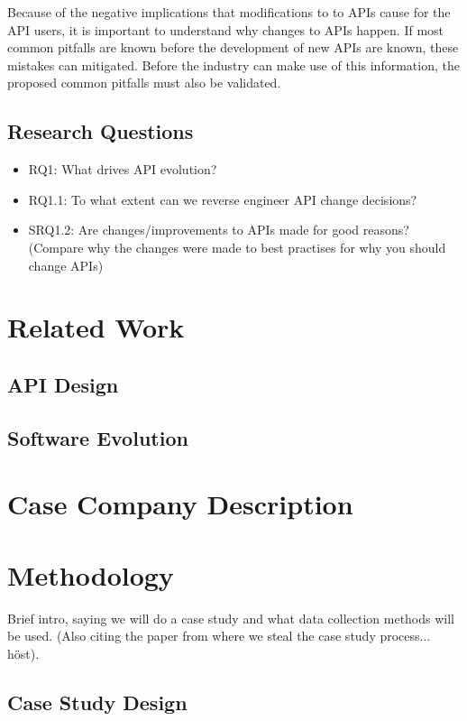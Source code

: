 \documentclass[10pt,twocolumn]{article}
\begin{document}
Because of the negative implications that modifications to to APIs cause for the API users, it is important to understand why changes to APIs happen. If most common pitfalls are known before the development of new APIs are known, these mistakes can mitigated. Before the industry can make use of this information, the proposed common pitfalls must also be validated. 


\subsection{Research Questions}
\begin{itemize}
\item RQ1: What drives API evolution? 
\item RQ1.1: To what extent can we reverse engineer API change decisions?
\item SRQ1.2: Are changes/improvements to APIs made for good reasons? (Compare why the changes were made to best practises for why you should change APIs)
\end{itemize}


\section{Related Work}

\subsection{API Design}

\subsection{Software Evolution}



\section{Case Company Description}



\section{Methodology}
Brief intro, saying we will do a case study and what data collection methods will be used. (Also citing the paper from where we steal the case study process... höst).

\subsection{Case Study Design}
\end{document}
